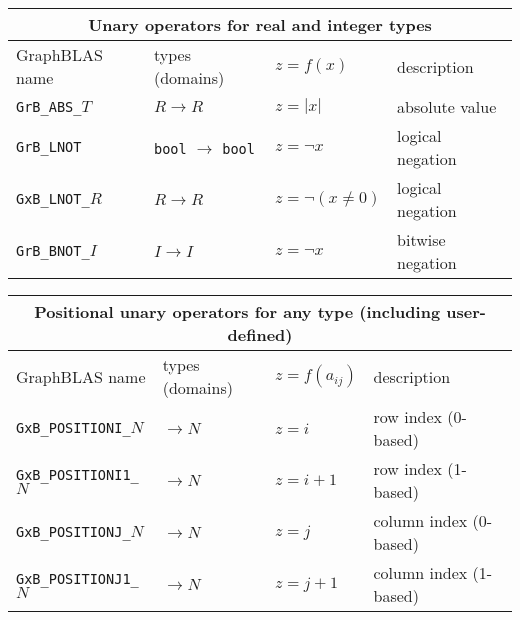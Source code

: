 \documentclass[12pt]{article}
\begin{document}
{{\vspace{0.2in}
\begin{tabular}{|llll|}
\hline
\multicolumn{4}{|c|}{Unary operators for real and integer types} \\
\hline
GraphBLAS name          & types (domains)   & $z=f(x)$      & description \\
\hline
\verb'GrB_ABS_'$T$      & $R \rightarrow R$ & $z = |x|$     & absolute value \\
\verb'GrB_LNOT'         & \verb'bool'
                          $\rightarrow$
                          \verb'bool'       & $z = \lnot x$ & logical negation \\
\verb'GxB_LNOT_'$R$     & $R \rightarrow R$ & $z = \lnot (x \ne 0)$ & logical negation \\
\verb'GrB_BNOT_'$I$     & $I \rightarrow I$ & $z = \lnot x$ & bitwise negation \\
\hline
\end{tabular}

\vspace{0.2in}
\begin{tabular}{|llll|}
\hline
\multicolumn{4}{|c|}{Positional unary operators for any type (including user-defined)} \\
\hline
GraphBLAS name            & types (domains)   & $z=f(a_{ij})$      & description \\
\hline
\verb'GxB_POSITIONI_'$N$  & $ \rightarrow N$  & $z = i$       & row index (0-based) \\
\verb'GxB_POSITIONI1_'$N$ & $ \rightarrow N$  & $z = i+1$     & row index (1-based) \\
\verb'GxB_POSITIONJ_'$N$  & $ \rightarrow N$  & $z = j$       & column index (0-based) \\
\verb'GxB_POSITIONJ1_'$N$ & $ \rightarrow N$  & $z = j+1$     & column index (1-based) \\
\hline
\end{tabular}
\vspace{0.2in}

}}
\end{document}
